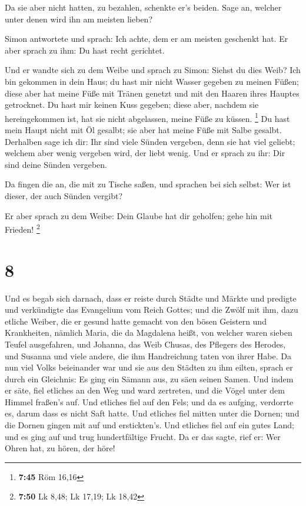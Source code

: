  Da sie aber nicht hatten, zu bezahlen, schenkte er's
beiden. Sage an, welcher unter denen wird ihn am meisten lieben?

 Simon antwortete und sprach: Ich achte, dem er am
meisten geschenkt hat. Er aber sprach zu ihm: Du hast recht gerichtet.

 Und er wandte sich zu dem Weibe und sprach zu Simon:
Siehst du dies Weib? Ich bin gekommen in dein Haus; du hast mir nicht
Wasser gegeben zu meinen Füßen; diese aber hat meine Füße mit Tränen
genetzt und mit den Haaren ihres Hauptes getrocknet.  Du
hast mir keinen Kuss gegeben; diese aber, nachdem sie hereingekommen
ist, hat sie nicht abgelassen, meine Füße zu küssen. \footnote{\textbf{7:45}
  Röm 16,16}  Du hast mein Haupt nicht mit Öl gesalbt;
sie aber hat meine Füße mit Salbe gesalbt.  Derhalben
sage ich dir: Ihr sind viele Sünden vergeben, denn sie hat viel geliebt;
welchem aber wenig vergeben wird, der liebt wenig.  Und
er sprach zu ihr: Dir sind deine Sünden vergeben.

 Da fingen die an, die mit zu Tische saßen, und sprachen
bei sich selbst: Wer ist dieser, der auch Sünden vergibt?

 Er aber sprach zu dem Weibe: Dein Glaube hat dir
geholfen; gehe hin mit Frieden! \footnote{\textbf{7:50} Lk 8,48; Lk
  17,19; Lk 18,42}

\hypertarget{section-2}{%
\section{8}\label{section-2}}

 Und es begab sich darnach, dass er reiste durch Städte
und Märkte und predigte und verkündigte das Evangelium vom Reich Gottes;
und die Zwölf mit ihm,  dazu etliche Weiber, die er gesund
hatte gemacht von den bösen Geistern und Krankheiten, nämlich Maria, die
da Magdalena heißt, von welcher waren sieben Teufel ausgefahren,
 und Johanna, das Weib Chusas, des Pflegers des Herodes,
und Susanna und viele andere, die ihm Handreichung taten von ihrer Habe.
 Da nun viel Volks beieinander war und sie aus den Städten
zu ihm eilten, sprach er durch ein Gleichnis:  Es ging ein
Sämann aus, zu säen seinen Samen. Und indem er säte, fiel etliches an
den Weg und ward zertreten, und die Vögel unter dem Himmel fraßen's auf.
 Und etliches fiel auf den Fels; und da es aufging,
verdorrte es, darum dass es nicht Saft hatte.  Und
etliches fiel mitten unter die Dornen; und die Dornen gingen mit auf und
erstickten's.  Und etliches fiel auf ein gutes Land; und
es ging auf und trug hundertfältige Frucht. Da er das sagte, rief er:
Wer Ohren hat, zu hören, der höre!

